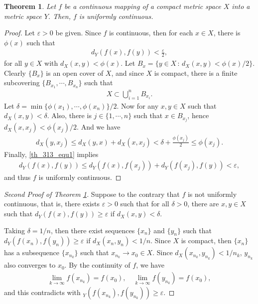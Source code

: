 \documentclass[11pt]{book}
\newtheorem{theorem}{Theorem}[chapter]
\theoremstyle{definition}
\numberwithin{equation}{chapter}
\begin{document}
\begin{theorem}\label{th_313}
Let $f$ be a continuous mapping of a compact metric space $X$ into a metric space $Y$. Then, $f$ is uniformly continuous.
\end{theorem}
\begin{proof}
Let $\varepsilon > 0$ be given. Since $f$ is continuous, then for each $x \in X$, there is $\phi(x)$ such that
\begin{align}\label{th_313_equ1}
    d_Y(f(x),f(y)) < \frac{\varepsilon}{2},
\end{align}
for all $y \in X$ with $d_X(x,y) < \phi(x)$. Let $B_x = \{y \in X \,:\, d_X(x,y) < \phi(x)/2\}$. Clearly $\{B_x\}$ is an open cover of $X$, and since $X$ is compact, there is a finite subcovering $\{B_{x_1}, \cdots, B_{x_n}\}$ such that 
\begin{align*}
    X \subset \bigcup^n_{i=1} B_{x_i}.
\end{align*}
Let $\delta = \min\{\phi(x_1), \cdots, \phi(x_n)\}/2$. Now for any $x,y \in X$ such that $d_X(x,y) < \delta$. Also, there is $j \in \{1,\cdots,n\}$ such that $x \in B_{x_j}$, hence $d_X(x,x_j) < \phi(x_j)/2$. And we have
\begin{align*}
    d_X(y, x_j) \leq d_X(y,x) + d_X(x, x_j) < \delta + \frac{\phi(x_j)}{2} \leq \phi(x_j).
\end{align*}
Finally, \eqref{th_313_equ1} implies
\begin{align*}
    d_Y(f(x),f(y)) \leq d_Y(f(x), f(x_j)) + d_Y(f(x_j), f(y)) < \varepsilon,
\end{align*}
and thus $f$ is uniformly continuous.
\end{proof}



\begin{proof}[Second Proof of Theorem \ref{th_313}]
Suppose to the contrary that $f$ is not uniformly continuous, that is, there exists $\varepsilon > 0$ such that for all $\delta > 0$, there are $x,y \in X$ such that $d_Y(f(x),f(y)) \geq \varepsilon$ if $d_X(x,y) < \delta$. 

Taking $\delta = 1/n$, then there exist sequences $\{x_n\}$ and $\{y_n\}$ such that $d_Y(f(x_n),f(y_n)) \geq \varepsilon$ if $d_X(x_n,y_n) < 1/n$. Since $X$ is compact, then $\{x_n\}$ has a subsequence $\{x_{n_k}\}$ such that $x_{n_k} \to x_0 \in X$. Since $d_X(x_{n_k},y_{n_k}) < 1/n_k$, $y_{n_k}$ also converges to $x_0$. By the continuity of $f$, we have 
\begin{align*}
    \lim_{k\to\infty} f(x_{n_k}) = f(x_0), \quad \lim_{k\to\infty} f(y_{n_k}) = f(x_0),
\end{align*}
and this contradicts with $_Y(f(x_{n_k}),f(y_{n_k})) \geq \varepsilon$.
\end{proof}
\end{document}
